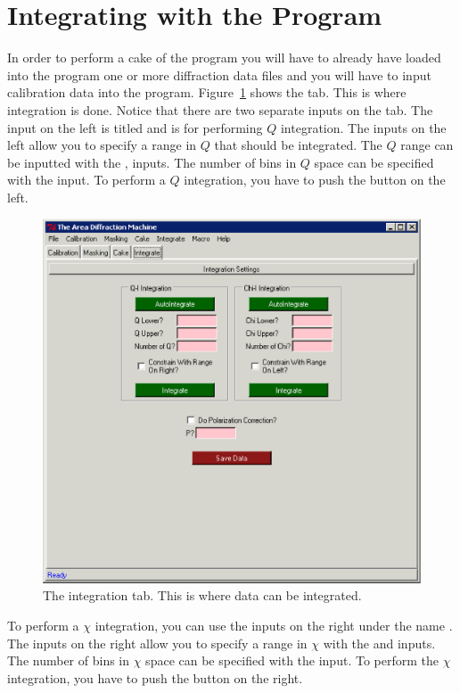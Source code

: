 \section{Integrating with the Program}


In order to perform a cake of the program you will have to 
already have loaded into the program one or more diffraction
data files and you will have to input calibration data
into the program. Figure~\ref{integration_tab} shows the
 tab. This is where integration is done.
Notice that there are two separate inputs on the tab. 
The input on the left is titled 
and is for performing $Q$ integration.
The inputs on the left allow you to specify a
range in $Q$ that should be integrated.
The $Q$ range can be inputted with the
,  inputs. The number of
bins in $Q$ space can be specified with the
 input. 
To perform a $Q$ integration, you have to push
the  button on the left.

\begin{figure}
    \centering
    \includegraphics[scale=.75]{figures/integration_tab.eps}
    \caption{The integration tab. This is where data
    can be integrated.} 
    \label{integration_tab}
\end{figure}

To perform a $\chi$ integration, you can use the inputs
on the right under the name .
The inputs on the right allow you to specify
a range in $\chi$ with the  and
 inputs. The number of bins in
$\chi$ space can be specified with the
 input. To perform the
$\chi$ integration, you have to push the
 button on the right.

